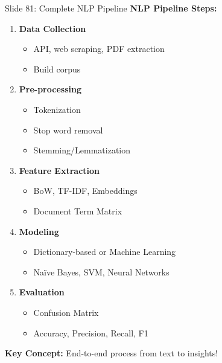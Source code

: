 \documentclass[8pt]{beamer}
\begin{document}
	\begin{frame}{Slide 81: Complete NLP Pipeline}
		\fontsize{6.5}{7.5}\selectfont
		\textbf{NLP Pipeline Steps:}
		\begin{enumerate}
			\item \textbf{Data Collection}
			\begin{itemize}
				\item API, web scraping, PDF extraction
				\item Build corpus
			\end{itemize}
			\item \textbf{Pre-processing}
			\begin{itemize}
				\item Tokenization
				\item Stop word removal
				\item Stemming/Lemmatization
			\end{itemize}
			\item \textbf{Feature Extraction}
			\begin{itemize}
				\item BoW, TF-IDF, Embeddings
				\item Document Term Matrix
			\end{itemize}
			\item \textbf{Modeling}
			\begin{itemize}
				\item Dictionary-based or Machine Learning
				\item Naïve Bayes, SVM, Neural Networks
			\end{itemize}
			\item \textbf{Evaluation}
			\begin{itemize}
				\item Confusion Matrix
				\item Accuracy, Precision, Recall, F1
			\end{itemize}
		\end{enumerate}
		
		\textcolor{myblue}{\textbf{Key Concept:}} End-to-end process from text to insights!
	\end{frame}
	
\end{document}
